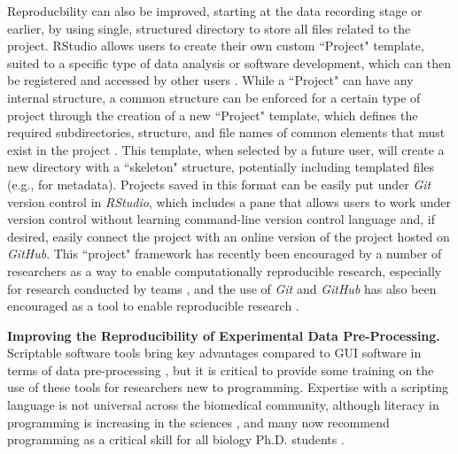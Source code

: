 \documentclass[pdftex,english,11pt,parskip=half]{scrartcl}
\begin{document}
Reproducbility can also be improved, starting at the data recording stage or earlier, by using single, structured directory to store all files related to the project. RStudio allows users to create their own custom ``Project" template, suited to a specific type of data analysis or software development, which can then be registered and accessed by other users \cite{rstudioprojecttemplate}. While a ``Project" can have any internal structure, a common structure can be enforced for a certain type of project through the creation of a new ``Project" template, which defines the required subdirectories, structure, and file names of common elements that must exist in the project \cite{rstudioprojecttemplate}. This template, when selected by a future user, will create a new directory with a ``skeleton" structure, potentially including templated files (e.g., for metadata). Projects saved in this format can be easily put under \textit{Git} version control in \textit{RStudio}, which includes a pane that allows users to work under version control without learning command-line version control language and, if desired, easily connect the project with an online version of the project hosted on \textit{GitHub}. This ``project" framework has recently been encouraged by a number of researchers as a way to enable computationally reproducible research, especially for research conducted by teams \cite{marwick2017packaging, parker2017opinionated, lowndes2017our}, and the use of \textit{Git} and \textit{GitHub} has also been encouraged as a tool to enable reproducible research \cite{piccolo2016tools, ram2013git, bryan2017excuse, lowndes2017our, cetinkaya2017infrastructure}.  

\textbf{Improving the Reproducibility of Experimental Data Pre-Processing.} Scriptable software tools bring key advantages compared to GUI software in terms of data pre-processing \cite{cetinkaya2017infrastructure, huber2015orchestrating, preeyanon2014reproducible, piccolo2016tools}, but it is critical to provide some training on the use of these tools for researchers new to programming. Expertise with a scripting language is not universal across the biomedical community, although literacy in programming is increasing in the sciences \cite{ram2013git}, and many now recommend programming as a critical skill for all biology Ph.D. students \cite{list2017ten}. 
\end{document}
